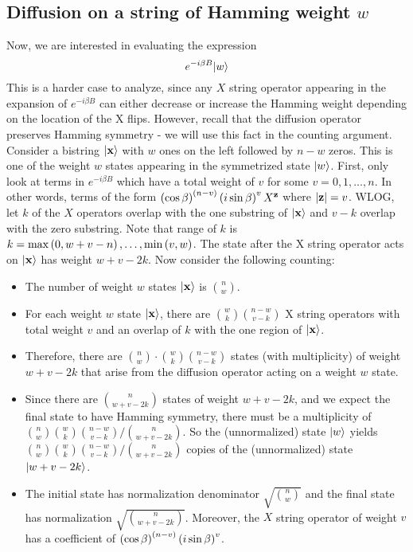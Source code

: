 \documentclass[11pt]{article}
\begin{document}
\begin{appendices}
\section{Diffusion on a string of Hamming weight $w$}
\label{appendix:appB}
Now, we are interested in evaluating the expression 
$$
e^{-i\beta B}|w\rangle
$$
This is a harder case to analyze, since any $X$ string operator appearing in the expansion of $e^{-i\beta B}$ can either decrease or increase the Hamming weight depending on the location of the X flips. However, recall that the diffusion operator preserves Hamming symmetry - we will use this fact in the counting argument. Consider a bistring $|\mathbf{x}\rangle$ with $w$ ones on the left followed by $n-w$ zeros. This is one of the weight $w$ states appearing in the symmetrized state $|w\rangle$. First, only look at terms in $e^{-i\beta B}$ which have a total weight of $v$ for some $v=0,1,\ldots,n$. In other words, terms of the form $\left(\cos\beta\right)^{\left(n-v\right)}\left(i\sin\beta\right)^{v}X^{\mathbf{z}}$ where $|\mathbf{z}|=v$. WLOG, let $k$ of the $X$ operators overlap with the one substring of $|\mathbf{x}\rangle$ and $v-k$ overlap with the zero substring. Note that range of $k$ is $k=\max\left(0,w+v-n\right),\ldots , \min\left(v,w\right)$. The state after the X string operator acts on $|\mathbf{x}\rangle$ has weight $w+v-2k$. Now consider the following counting:
\begin{itemize}
\item The number of weight $w$ states $|\mathbf{x}\rangle$ is $\binom{n}{w}$.
\item For each weight $w$ state $|\mathbf{x}\rangle$, there are $\binom{w}{k}\binom{n-w}{v-k}$ X string operators with total weight $v$ and an overlap of $k$ with the one region of $|\mathbf{x}\rangle$.
\item Therefore, there are $\binom{n}{w}\cdot\binom{w}{k}\binom{n-w}{v-k}$ states (with multiplicity) of weight $w+v-2k$ that arise from the diffusion operator acting on a weight $w$ state. 
\item Since there are $\binom{n}{w+v-2k}$ states of weight $w+v-2k$, and we expect the final state to have Hamming symmetry, there must be a multiplicity of $\binom{n}{w}\binom{w}{k}\binom{n-w}{v-k}/\binom{n}{w+v-2k}$. So the (unnormalized) state $|w\rangle$ yields $\binom{n}{w}\binom{w}{k}\binom{n-w}{v-k}/\binom{n}{w+v-2k}$ copies of the (unnormalized) state $|w+v-2k\rangle$.
\item The initial state has normalization denominator $\sqrt{\binom{n}{w}}$ and the final state has normalization $\sqrt{\binom{n}{w+v-2k}}$. Moreover, the $X$ string operator of weight $v$ has a coefficient of $\left(\cos\beta\right)^{\left(n-v\right)}\left(i\sin\beta\right)^{v}$.

\end{itemize}
\end{appendices}
\end{document}
